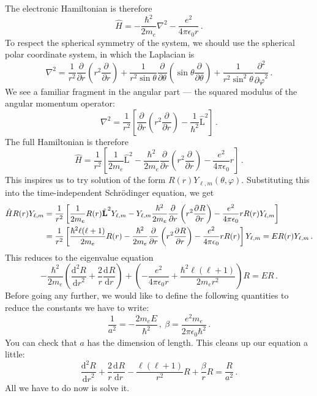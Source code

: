 \documentclass{article}
\theoremstyle{plain}\theoremheaderfont{\normalfont\itshape}\theorembodyfont{\rmfamily}\theoremseparator{.}\newtheorem*{rem}{Remark}\newtheorem*{ex}{Example}\newtheorem*{proof}{Proof}\newtheorem*{altp}{Alternative proof}
\theoremstyle{plain}\theoremheaderfont{\normalfont\bfseries}\theorembodyfont{\rmfamily}\theoremseparator{.}\newtheorem{thm}{Theorem}[section]\newtheorem{lem}[thm]{Lemma}\newtheorem{prop}[thm]{Proposition}\newtheorem*{cor}{Corollary}\newtheorem{defn}[thm]{Definition}\newtheorem{clm}[thm]{Claim}\newtheorem{clminproof}{Claim}
\theoremstyle{break}\theoremheaderfont{\normalfont\itshape}\theorembodyfont{\rmfamily}\theoremseparator{.\medskip}\newtheorem*{proofskip}{Proof}\newtheorem*{exs}{Examples}\newtheorem*{rems}{Remarks}
\theoremstyle{break}\theoremheaderfont{\normalfont\bfseries}\theorembodyfont{\rmfamily}\theoremseparator{.\medskip}\newtheorem{lemskip}[thm]{Lemma}\newtheorem{defnskip}[thm]{Definition}\newtheorem{propskip}[thm]{Proposition}\newtheorem{thmskip}[thm]{Theorem}
\numberwithin{equation}{section}
\newcommand{\dv}[3][]{\frac{\mathrm{d}^{#1} #2}{{\mathrm{d} #3}^{#1}}}
\newcommand{\pdv}[3][]{\frac{\partial^{#1} #2}{{\partial #3}^{#1}}}
\newcommand{\vb}[1]{\bm{\mathrm{#1}}}
\newcommand{\laplacian}{\nabla^2}
\begin{document}
    The electronic Hamiltonian is therefore
    \begin{equation}
        \hat{H}=-\frac{\hbar^2}{2m_e}\laplacian-\frac{e^2}{4\pi\epsilon_0 r}\,.
    \end{equation}
    To respect the spherical symmetry of the system, we should use the spherical polar coordinate system, in which the Laplacian is
    \begin{equation}
        \laplacian=\frac{1}{r^2}\pdv{}{r}\left(r^2\pdv{}{r}\right)+\frac{1}{r^2\sin\theta}\pdv{}{\theta}\left(\sin\theta\pdv{}{\theta}\right)+\frac{1}{r^2\sin^2\theta}\pdv[2]{}{\varphi}\,.
    \end{equation}
    We see a familiar fragment in the angular part --- the squared modulus of the angular momentum operator:
    \begin{equation}
        \laplacian=\frac{1}{r^2}\left[\pdv{}{r}\left(r^2\pdv{}{r}\right)-\frac{1}{\hbar^2}\hat{\vb{L}}^2\right]\,.
    \end{equation}
    The full Hamiltonian is therefore
    \begin{equation}
        \hat{H}=\frac{1}{r^2}\left[\frac{1}{2m_e}\hat{\vb{L}}^2-\frac{\hbar^2}{2m_e}\pdv{}{r}\left(r^2\pdv{}{r}\right)-\frac{e^2}{4\pi\epsilon_0}r\right]\,.
    \end{equation}
    This inspires us to try solution of the form \(R(r)Y_{\ell,m}(\theta,\varphi)\). Substituting this into the time-independent Schr\"{o}dinger equation, we get
    \begin{align}
        \hat{H}R(r)Y_{\ell,m}&=\frac{1}{r^2}\left[\frac{1}{2m_e}R(r)\hat{\vb{L}}^2 Y_{\ell,m}-Y_{\ell,m}\frac{\hbar^2}{2m_e}\pdv{}{r}\left(r^2\pdv{R}{r}\right)-\frac{e^2}{4\pi\epsilon_0}rR(r)Y_{\ell,m}\right] \notag \\
        &=\frac{1}{r^2}\left[\frac{\hbar^2\ell(\ell+1)}{2m_e}R(r)-\frac{\hbar^2}{2m_e}\pdv{}{r}\left(r^2\pdv{R}{r}\right)-\frac{e^2}{4\pi\epsilon_0}rR(r)\right]Y_{\ell,m}=ER(r)Y_{\ell,m}\,.
    \end{align}
    This reduces to the eigenvalue equation
    \begin{equation}
        -\frac{\hbar^2}{2m_e}\left(\dv[2]{R}{r}+\frac{2}{r}\dv{R}{r}\right)+\left(-\frac{e^2}{4\pi\epsilon_0 r}+\frac{\hbar^2\ell(\ell+1)}{2m_e r^2}\right)R=ER\,.
    \end{equation}
    Before going any further, we would like to define the following quantities to reduce the constants we have to write:
    \begin{equation}
        \frac{1}{a^2}=-\frac{2m_e E}{\hbar^2}\,,\ \beta=\frac{e^2 m_e}{2\pi\epsilon_0\hbar^2}\,.
    \end{equation}
    You can check that \(a\) has the dimension of length. This cleans up our equation a little:
    \begin{equation}\label{hydrogen_R_eqn}
        \dv[2]{R}{r}+\frac{2}{r}\dv{R}{r}-\frac{\ell(\ell+1)}{r^2}R+\frac{\beta}{r}R=\frac{R}{a^2}\,.
    \end{equation}
    All we have to do now is solve it.
\end{document}
